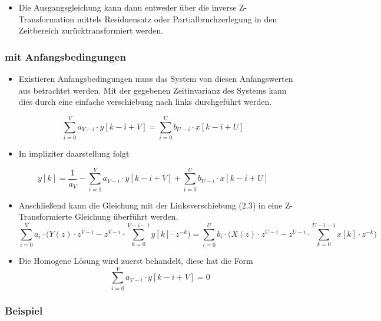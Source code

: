 \documentclass[11pt]{article}
\providecommand{\tightlist}{%
      \setlength{\itemsep}{0pt}\setlength{\parskip}{0pt}}
\begin{document}
    \begin{itemize}
\tightlist
\item
  Die Ausgangsgleichung kann dann entweder über die inverse
  Z-Transformation mittels Residuensatz oder Partialbruchzerlegung in
  den Zeitbereich zurücktransformiert werden.
\end{itemize}

    \subsubsection{mit Anfangsbedingungen}\label{mit-anfangsbedingungen}

\begin{itemize}
\tightlist
\item
  Existieren Anfangsbedingungen muss das System von diesen Anfangswerten
  aus betrachtet werden. Mit der gegebenen Zeitinvarianz des Systems
  kann dies durch eine einfache verschiebung nach links durchgeführt
  werden.
\end{itemize}

    \[\sum_{i = 0}^V a_{V-i} \cdot y[k-i+V] = \sum_{i = 0}^U b_{U-i} \cdot x[k-i+U]\]

    \begin{itemize}
\tightlist
\item
  In impliziter daarstellung folgt
\end{itemize}

    \[ y[k] = \frac{1}{a_V} - \sum_{i = 1}^V a_{V-i} \cdot y[k-i+V] + \sum_{i = 0}^U b_{U-i} \cdot x[k-i+U] \]

    \begin{itemize}
\tightlist
\item
  Anschließend kann die Gleichung mit der Linksverschiebung (2.3) in
  eine Z-Transformierte Gleichung überführt werden.
  \[\sum_{i=0}^V a_i \cdot \big(Y(z) \cdot z^{V-i} - z^{V-i} \cdot \sum_{k = 0}^{V-i-1} y[k] \cdot z^{-k}\big) = \sum_{i=0}^U b_i \cdot \big(X(z) \cdot z^{U-i} - z^{U-i} \cdot \sum_{k = 0}^{U-i-1} x[k] \cdot z^{-k}\big)\]
\end{itemize}

    \begin{itemize}
\tightlist
\item
  Die Homogene Lösung wird zuerst behandelt, diese hat die Form \[
  \sum_{i = 0}^V a_{V-i} \cdot y[k-i+V] = 0
  \]
\end{itemize}

    \subsubsection{Beispiel}\label{beispiel}
\end{document}
